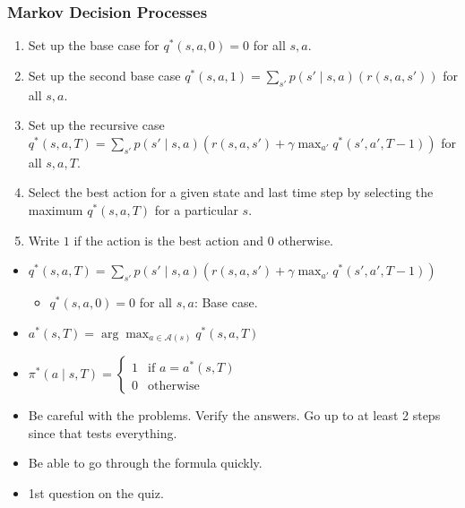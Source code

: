 \subsubsection{Markov Decision Processes}
\begin{process}
    \begin{enumerate}
        \item Set up the base case for $q^*(s,a,0) = 0$ for all $s,a$.
        \item Set up the second base case $q^*(s,a,1) = \sum_{s'} p(s' \mid s, a) \left( r(s, a, s') \right)$ for all $s,a$.
        \item Set up the recursive case $q^*(s,a,T) = \sum_{s'} p(s' \mid s, a) \left( r(s, a, s') + \gamma \max_{a'} q^*(s',a',T-1) \right)$ for all $s,a,T$.
        \item Select the best action for a given state and last time step by selecting the maximum $q^*(s,a,T)$ for a particular $s$.
        \item Write $1$ if the action is the best action and $0$ otherwise.
    \end{enumerate}
\end{process}

\begin{warning}
    \begin{itemize}
        \item $q^*(s,a,T) = \sum_{s'} p(s' \mid s, a) \left( r(s, a, s') + \gamma \max_{a'} q^*(s',a',T-1) \right)$
        \begin{itemize}
            \item $q^*(s,a,0) = 0$ for all $s,a$: Base case.
        \end{itemize}
        \item $a^*(s,T) = \arg \max_{a \in \mathcal{A}(s)} q^* (s,a,T)$
        \item $\pi^*(a \mid s,T) = \begin{cases}
                1 & \text{if } a = a^*(s,T) \\
                0 & \text{otherwise}
            \end{cases}$ \\
    \end{itemize}
\end{warning}

\begin{warning}
    \begin{itemize}
        \item Be careful with the problems. Verify the answers. Go up to at least 2 steps since that tests everything.
        \item Be able to go through the formula quickly. 
        \item 1st question on the quiz.
    \end{itemize}
\end{warning}
\newpage


